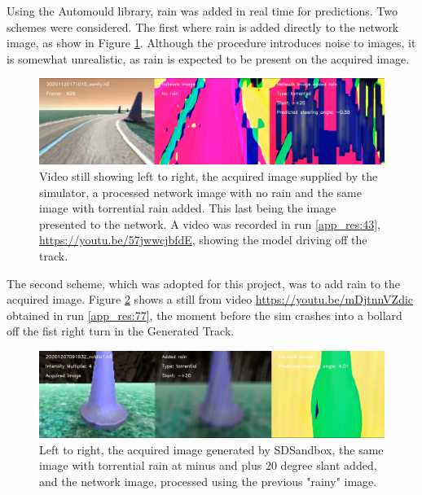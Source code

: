 Using the Automould library, rain was added in real time for predictions. Two schemes were considered. The first where rain is added directly to the network image, as show in Figure \ref{fig:tcpflow_Run43}. Although the procedure introduces noise to images, it is somewhat unrealistic, as rain is expected to be present on the acquired image.
\begin{figure}[ht]
 \centering 
 \includegraphics[width=\textwidth]{Figures/tcpflow_Run43.png}
 \caption{Video still showing left to right, the acquired image supplied by the simulator, a processed network image with no rain and the same image with torrential rain added. This last being the image presented to the network. A video was recorded in run \ref{app_res:43}, \url{https://youtu.be/57jwwcjbfdE}, showing the model driving off the track.}
 \label{fig:tcpflow_Run43} 
\end{figure}
The second scheme, which was adopted for this project, was to add rain to the acquired image. Figure  \ref{fig:youtube20201207091932nvidia1torrential20mult_4_h5} shows a still from video \url{https://youtu.be/mDjtnnVZdic} obtained in run \ref{app_res:77}, the moment before the sim crashes into a bollard off the fist right turn in the Generated Track.
\begin{figure}[ht]
 \centering 
 \includegraphics[width=\textwidth]{Figures/youtube20201207091932nvidia1torrential20mult_4_h5.png}
 \caption{Left to right, the acquired image generated by SDSandbox, the same image with torrential rain at minus and plus 20 degree slant added, and the network image, processed using the previous "rainy" image.}
 \label{fig:youtube20201207091932nvidia1torrential20mult_4_h5} 
\end{figure}



